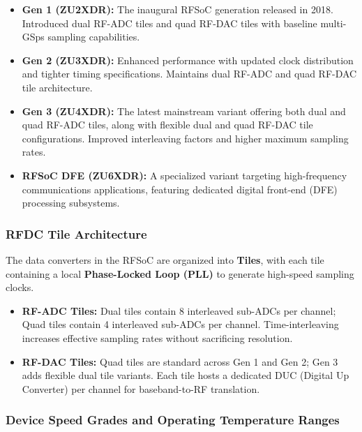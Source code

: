 \documentclass[
]{article}
\providecommand{\tightlist}{%
  \setlength{\itemsep}{0pt}\setlength{\parskip}{0pt}}
\begin{document}
\begin{itemize}
\tightlist
\item
  \textbf{Gen 1 (ZU2XDR):} The inaugural RFSoC generation released in
  2018. Introduced dual RF-ADC tiles and quad RF-DAC tiles with baseline
  multi-GSps sampling capabilities.
\item
  \textbf{Gen 2 (ZU3XDR):} Enhanced performance with updated clock
  distribution and tighter timing specifications. Maintains dual RF-ADC
  and quad RF-DAC tile architecture.
\item
  \textbf{Gen 3 (ZU4XDR):} The latest mainstream variant offering both
  dual and quad RF-ADC tiles, along with flexible dual and quad RF-DAC
  tile configurations. Improved interleaving factors and higher maximum
  sampling rates.
\item
  \textbf{RFSoC DFE (ZU6XDR):} A specialized variant targeting
  high-frequency communications applications, featuring dedicated
  digital front-end (DFE) processing subsystems.
\end{itemize}

\subsubsection{RFDC Tile Architecture}\label{rfdc-tile-architecture}

The data converters in the RFSoC are organized into \textbf{Tiles}, with
each tile containing a local \textbf{Phase-Locked Loop (PLL)} to
generate high-speed sampling clocks.

\begin{itemize}
\tightlist
\item
  \textbf{RF-ADC Tiles:} Dual tiles contain 8 interleaved sub-ADCs per
  channel; Quad tiles contain 4 interleaved sub-ADCs per channel.
  Time-interleaving increases effective sampling rates without
  sacrificing resolution.
\item
  \textbf{RF-DAC Tiles:} Quad tiles are standard across Gen 1 and Gen 2;
  Gen 3 adds flexible dual tile variants. Each tile hosts a dedicated
  DUC (Digital Up Converter) per channel for baseband-to-RF translation.
\end{itemize}

\subsubsection{Device Speed Grades and Operating Temperature
Ranges}\label{device-speed-grades-and-operating-temperature-ranges}
\end{document}
